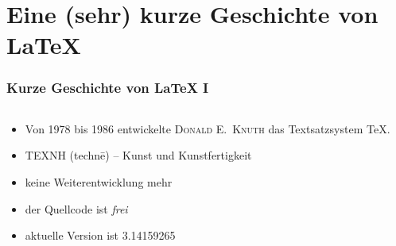 \section{Eine (sehr) kurze Geschichte von \LaTeX{}}
\begin{frame}\frametitle{Kurze Geschichte von \LaTeX{} I}

  \begin{columns}
    \begin{column}{0.7\linewidth}
      \begin{itemize}
      \item<1-> Von 1978 bis 1986 entwickelte \textsc{Donald E.\ Knuth} das
        Textsatzsystem \TeX{}.
      \item<2-> ΤΕΧΝΗ (technē) -- Kunst und Kunstfertigkeit
      \item<3-> keine Weiterentwicklung mehr
      \item<4-> der Quellcode ist \textit{frei}
      \item<5-> aktuelle Version ist 3.14159265
      \end{itemize}
    \end{column}
    \begin{column}{0.3\linewidth}
    \end{column}
  \end{columns}
\end{frame}

